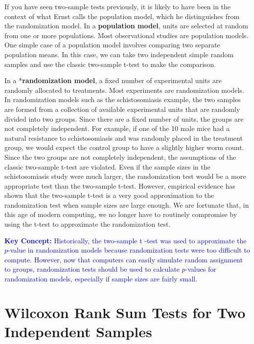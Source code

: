 \documentclass[
]{report}
\begin{document}
If you have seen two-sample tests previously, it is likely to have been in the context of what Ernst calls the population model, which he distinguishes from the randomization model. In a \textbf{population model}, units are selected at random from one or more populations. Most observational studies are population models. One simple case of a population model involves comparing two separate population means. In this case, we can take two independent simple random samples and use the classic two-sample t-test to make the comparison.

In a *\textbf{randomization model}, a fixed number of experimental units are randomly allocated to treatments. Most experiments are randomization models. In randomization models such as the schistosomiasis example, the two samples are formed from a collection of available experimental units that are randomly divided into two groups. Since there are a fixed number of units, the groups are not completely independent. For example, if one of the 10 male mice had a natural resistance to schistosomiasis and was randomly placed in the treatment group, we would expect the control group to have a slightly higher worm count. Since the two groups are not completely independent, the assumptions of the classic two-sample t-test are violated. Even if the sample sizes in the schistosomiasis study were much larger, the randomization test would be a more appropriate test than the two-sample t-test. However, empirical evidence has shown that the two-sample t-test is a very good approximation to the randomization test when sample sizes are large enough. We are fortunate that, in this age of modern computing, we no longer have to routinely compromise by using the t-test to approximate the randomization test.

\textbf{\textcolor{blue}{Key Concept:}}
\textcolor{blue}{Historically, the two-sample t -test was used to approximate the $p$-value in randomization models because randomization tests were too difficult to compute. However, now that computers can easily simulate random assignment to groups, randomization tests should be used to calculate $p$-values for randomization models, especially if sample sizes are fairly small.}

\hypertarget{wilcoxon-rank-sum-tests-for-two-independent-samples}{%
\section{\texorpdfstring{\textbf{Wilcoxon Rank Sum Tests for Two Independent Samples}}{Wilcoxon Rank Sum Tests for Two Independent Samples}}\label{wilcoxon-rank-sum-tests-for-two-independent-samples}}
\end{document}
